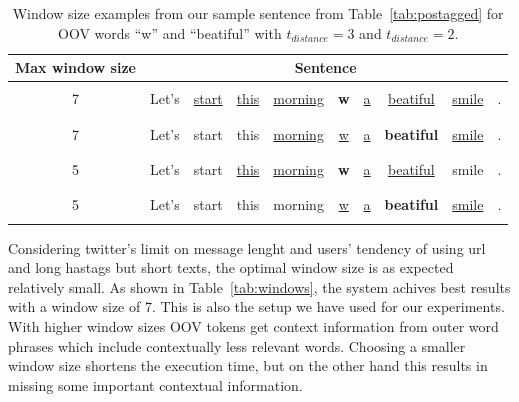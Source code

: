 \documentclass[a4paper,onesided,12pt]{report}
\begin{document}
\begin{table}[thb]
  \caption{Window size examples from our sample sentence from Table~\ref{tab:postagged} for OOV words ``w'' and ``beatiful'' with $t_{distance}=3$ and $t_{distance}=2$.}
  \centering
  \begin{tabular}{|c|*9{c}|}
    \hline
    \textbf{Max window size} & \multicolumn{9}{c|}{\textbf{Sentence}} \\
    \hline & & & & & & & & &  \\ \cline{3-9}

    7 & Let's & \multicolumn{1}{|c}{\underline{start}} & \underline{this} & \underline{morning} & \textbf{w} & \underline{a} & \underline{beatiful} & \multicolumn{1}{c|}{\underline{smile}} & . \\
    \cline{3-9} & \multicolumn{9}{c|}{} \\ [0.01cm]
    \hline  & \multicolumn{9}{c|}{} \\ \cline{5-9}

    7 & Let's & start & this & \multicolumn{1}{|c}{\underline{morning}} &\underline{w} & \underline{a} & \textbf{beatiful} & \multicolumn{1}{c|}{\underline{smile}} & . \\
    \cline{5-9} & \multicolumn{9}{c|}{} \\ [0.01cm]
    \hline  & & & & & & & & & \\ \cline{4-8}

    5 & Let's & start & \multicolumn{1}{|c}{\underline{this}} & \underline{morning} & \textbf{w} & \underline{a} & \multicolumn{1}{c|}{\underline{beatiful}} & smile & . \\
    \cline{4-8} & & & & & & & & & \\ [0.01cm]
    \hline  & & & & & & & & & \\ \cline{6-9}

    5 & Let's & start & this & morning & \multicolumn{1}{|c}{\underline{w}} & \underline{a} & \textbf{beatiful} & \multicolumn{1}{c|}{\underline{smile}} & . \\
    \cline{6-9} & & & & & & & & & \\ [0.01cm]
    \hline
  \end{tabular}
\label{tab:windowsize}
\end{table}

Considering twitter's limit on message lenght and users' tendency of using url and long hastags but short texts, the optimal window size is as expected relatively small. As shown in Table~\ref{tab:windows}, the system achives best results with a window size of 7. This is also the setup we have used for our experiments. With higher window sizes OOV tokens get context information from outer word phrases which include contextually less relevant words. Choosing a smaller window size shortens the execution time, but on the other hand this results in missing some important contextual information.
\end{document}
